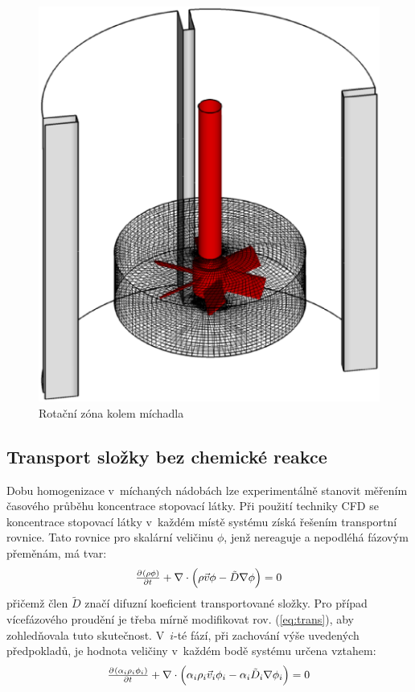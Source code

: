 \begin{figure}[h!]
\centering
  \includegraphics[scale=0.35]{images/sm.eps}
  \caption{Rotační zóna kolem míchadla}
  \label{fig:mrf}
\end{figure} 

\subsection{Transport složky bez chemické reakce}
Dobu homogenizace v~míchaných nádobách lze experimentálně stanovit měřením ča\-so\-vé\-ho průběhu koncentrace stopovací látky. Při použití techniky CFD se koncentrace stopovací látky v~každém místě systému získá řešením transportní rovnice. Tato rovnice pro skalární veličinu $\phi$, jenž nereaguje a nepodléhá fázovým přeměnám, má tvar: 
\begin{equation}
	\pd{\kula{\rho \phi}}{t} + \nabla \cdot \kula{\rho\vec{v}\phi - \tilde{D}\nabla\phi} = 0
	\label{eq:trans}
\end{equation}  
přičemž člen $\tilde{D}$ značí difuzní koeficient transportované složky. Pro případ vícefázového proudění je třeba mírně modifikovat rov. (\ref{eq:trans}), aby zohledňovala tuto skutečnost. V~$i$-té fází, při zachování výše uvedených předpokladů, je hodnota veličiny v~každém bodě systému určena vztahem:
\begin{equation}
	\pd{\kula{\alpha_{i} \rho_{i} \phi_{i}}}{t} + \nabla \cdot \kula{\alpha_{i} \rho_{i}\vec{v}_{i}\phi_{i} - \alpha_{i} \tilde{D}_{i}\nabla\phi_{i}} = 0
	\label{eq:trans_mix}
\end{equation}  
